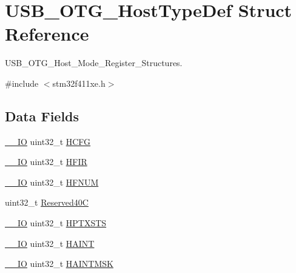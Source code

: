 \hypertarget{struct_u_s_b___o_t_g___host_type_def}{}\section{U\+S\+B\+\_\+\+O\+T\+G\+\_\+\+Host\+Type\+Def Struct Reference}
\label{struct_u_s_b___o_t_g___host_type_def}


U\+S\+B\+\_\+\+O\+T\+G\+\_\+\+Host\+\_\+\+Mode\+\_\+\+Register\+\_\+\+Structures.  




{\ttfamily \#include $<$stm32f411xe.\+h$>$}

\subsection*{Data Fields}
\begin{DoxyCompactItemize}
\item 
\hyperlink{core__sc300_8h_aec43007d9998a0a0e01faede4133d6be}{\+\_\+\+\_\+\+IO} uint32\+\_\+t \hyperlink{struct_u_s_b___o_t_g___host_type_def_ab44a72e139c005445aac54e866f7750f}{H\+C\+FG}
\item 
\hyperlink{core__sc300_8h_aec43007d9998a0a0e01faede4133d6be}{\+\_\+\+\_\+\+IO} uint32\+\_\+t \hyperlink{struct_u_s_b___o_t_g___host_type_def_a509fd299e7540892623954ea4dc1313c}{H\+F\+IR}
\item 
\hyperlink{core__sc300_8h_aec43007d9998a0a0e01faede4133d6be}{\+\_\+\+\_\+\+IO} uint32\+\_\+t \hyperlink{struct_u_s_b___o_t_g___host_type_def_ab4f17f7ef96cf4933e30b1950925c613}{H\+F\+N\+UM}
\item 
uint32\+\_\+t \hyperlink{struct_u_s_b___o_t_g___host_type_def_a0d4a262443e6d12c065adcafabf787ee}{Reserved40C}
\item 
\hyperlink{core__sc300_8h_aec43007d9998a0a0e01faede4133d6be}{\+\_\+\+\_\+\+IO} uint32\+\_\+t \hyperlink{struct_u_s_b___o_t_g___host_type_def_af095d2e3da9e07f63ed7da99276eaaca}{H\+P\+T\+X\+S\+TS}
\item 
\hyperlink{core__sc300_8h_aec43007d9998a0a0e01faede4133d6be}{\+\_\+\+\_\+\+IO} uint32\+\_\+t \hyperlink{struct_u_s_b___o_t_g___host_type_def_af3c15285d6f2efdf4890ea5b27258aca}{H\+A\+I\+NT}
\item 
\hyperlink{core__sc300_8h_aec43007d9998a0a0e01faede4133d6be}{\+\_\+\+\_\+\+IO} uint32\+\_\+t \hyperlink{struct_u_s_b___o_t_g___host_type_def_aa4ec75921a9699f77ee14f377e1b86dc}{H\+A\+I\+N\+T\+M\+SK}
\end{DoxyCompactItemize}


